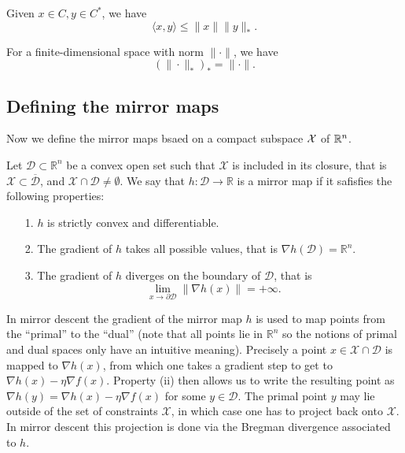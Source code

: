 \begin{theorem}
\label{thm: Cauchy-Schwarz for general norms}
Given $x \in C, y\in C^*$, we have
$$
\langle x, y\rangle \leqslant\|x\|\|y\|_* .
$$
\end{theorem}


\begin{theorem}
\label{thm: Self dual}
For a finite-dimensional space with norm $\|\cdot\|$, we have
$$
\left(\|\cdot\|_*\right)_*=\|\cdot\|.
$$
\end{theorem}

\subsection{Defining the mirror maps}
Now we define the mirror maps bsaed on a compact subspace $\mathcal{X}$ of $\mathbb{R}^n$.  



\begin{definition}
\label{def: Mirror map}
Let $\mathcal{D} \subset \mathbb{R}^n$ be a convex open set such that $\mathcal{X}$ is included in its closure, that is $\mathcal{X} \subset \overline{\mathcal{D}}$, and $\mathcal{X} \cap \mathcal{D} \neq \emptyset$. We say that $h: \mathcal{D} \rightarrow \mathbb{R}$ is a mirror map if it safisfies the following properties:
\begin{itemize}
    \item [1.] $h$ is strictly convex and differentiable.
    \item [2.] The gradient of $h$ takes all possible values, that is $\nabla h(\mathcal{D})=\mathbb{R}^n$.
    \item [3.] The gradient of $h$ diverges on the boundary of $\mathcal{D}$, that is
    $$
    \lim _{x \rightarrow \partial \mathcal{D}}\|\nabla h(x)\|=+\infty.
    $$
\end{itemize}
\end{definition}

In mirror descent the gradient of the mirror map $h$ is used to map points from the ``primal'' to the ``dual'' (note that all points lie in $\mathbb{R}^n$ so the notions of primal and dual spaces only have an intuitive meaning). Precisely a point $x \in \mathcal{X} \cap \mathcal{D}$ is mapped to $\nabla h(x)$, from which one takes a gradient step to get to $\nabla h(x)-\eta \nabla f(x)$. Property (ii) then allows us to write the resulting point as $\nabla h(y)=\nabla h(x)-\eta \nabla f(x)$ for some $y \in \mathcal{D}$. The primal point $y$ may lie outside of the set of constraints $\mathcal{X}$, in which case one has to project back onto $\mathcal{X}$. In mirror descent this projection is done via the Bregman divergence associated to $h$. 

